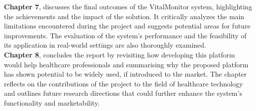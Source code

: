 \noindent\textbf{Chapter 7},    discusses the final outcomes of the VitalMonitor system, highlighting the achievements and the impact of the solution. It critically analyzes the main limitations encountered during the project and suggests potential areas for future improvements. The evaluation of the system's performance and the feasibility of its application in real-world settings are also thoroughly examined.\\

\noindent\textbf{Chapter 8}, concludes the report by revisiting how developing this platform would help healthcare professionals and summarising why the proposed platform has shown potential to be widely used, if introduced to the market. The chapter reflects on the contributions of the project to the field of healthcare technology and outlines future research directions that could further enhance the system's functionality and marketability.
